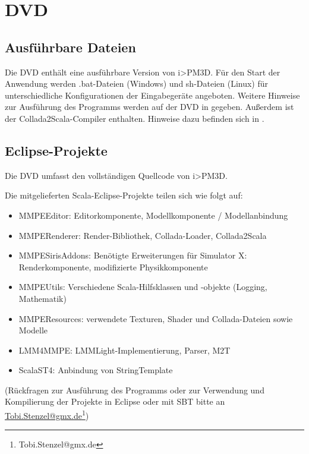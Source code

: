 \documentclass[a4paper,10pt]{sphinxmanual}
\begin{document}
\section{DVD}
\label{anhang_b:dvd}

\subsection{Ausführbare Dateien}
\label{anhang_b:ausfuhrbare-dateien}
Die DVD enthält eine ausführbare Version von i\textgreater{}PM3D.
Für den Start der Anwendung werden .bat-Dateien (Windows) und sh-Dateien (Linux) für unterschiedliche Konfigurationen der Eingabegeräte angeboten.
Weitere Hinweise zur Ausführung des Programms werden auf der DVD in  gegeben.
Außerdem ist der Collada2Scala-Compiler enthalten. Hinweise dazu befinden sich in .


\subsection{Eclipse-Projekte}
\label{anhang_b:eclipse-projekte}
Die DVD umfasst den vollständigen Quellcode von i\textgreater{}PM3D.

Die mitgelieferten Scala-Eclipse-Projekte teilen sich wie folgt auf:
\begin{itemize}
\item {} 
MMPEEditor: Editorkomponente, Modellkomponente / Modellanbindung

\item {} 
MMPERenderer: Render-Bibliothek, Collada-Loader, Collada2Scala

\item {} 
MMPESirisAddons: Benötigte Erweiterungen für Simulator X: Renderkomponente, modifizierte Physikkomponente

\item {} 
MMPEUtils: Verschiedene Scala-Hilfsklassen und -objekte (Logging, Mathematik)

\item {} 
MMPEResources: verwendete Texturen, Shader und Collada-Dateien sowie Modelle

\item {} 
LMM4MMPE: LMMLight-Implementierung, Parser, M2T

\item {} 
ScalaST4: Anbindung von StringTemplate

\end{itemize}

(Rückfragen zur Ausführung des Programms oder zur Verwendung und Kompilierung der Projekte in Eclipse oder mit SBT bitte an \href{mailto:Tobi.Stenzel@gmx.de}{Tobi.Stenzel@gmx.de}\footnote{Tobi.Stenzel@gmx.de})
\end{document}
